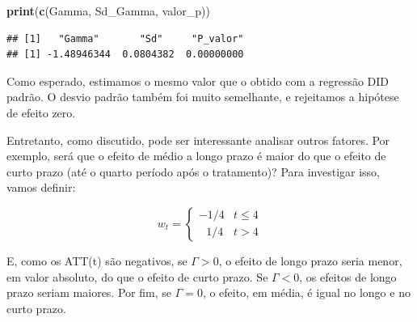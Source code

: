 \documentclass[portugues]{article}
\newenvironment{Shaded}{\begin{snugshade}}{\end{snugshade}}
\newcommand{\AttributeTok}[1]{\textcolor[rgb]{0.13,0.29,0.53}{#1}}
\newcommand{\CommentTok}[1]{\textcolor[rgb]{0.56,0.35,0.01}{\textit{#1}}}
\newcommand{\ConstantTok}[1]{\textcolor[rgb]{0.56,0.35,0.01}{#1}}
\newcommand{\DecValTok}[1]{\textcolor[rgb]{0.00,0.00,0.81}{#1}}
\newcommand{\FunctionTok}[1]{\textcolor[rgb]{0.13,0.29,0.53}{\textbf{#1}}}
\newcommand{\NormalTok}[1]{#1}
\newcommand{\OtherTok}[1]{\textcolor[rgb]{0.56,0.35,0.01}{#1}}
\newcommand{\SpecialCharTok}[1]{\textcolor[rgb]{0.81,0.36,0.00}{\textbf{#1}}}
\begin{document}
\begin{boxA}
\begin{Shaded}
\end{Shaded}

\begin{Shaded}
\begin{Highlighting}[]
\FunctionTok{print}\NormalTok{(}\FunctionTok{c}\NormalTok{(Gamma, Sd\_Gamma, valor\_p))}
\end{Highlighting}
\end{Shaded}

\begin{verbatim}
## [1]   "Gamma"       "Sd"     "P_valor"
## [1] -1.48946344  0.0804382  0.00000000
\end{verbatim}

Como esperado, estimamos o mesmo valor que o obtido com a regressão DID padrão. O desvio padrão também foi muito semelhante, e rejeitamos a hipótese de efeito zero.

Entretanto, como discutido, pode ser interessante analisar outros fatores. Por exemplo, será que o efeito de médio a longo prazo é maior do que o efeito de curto prazo (até o quarto período após o tratamento)? Para investigar isso, vamos definir:

$$ w_t = \begin{cases} -1/4 & t \leq 4 \\ \text{  } 1/4 & t > 4 \end{cases} $$

E, como os ATT(t) são negativos, se $\Gamma > 0$, o efeito de longo prazo seria menor, em valor absoluto, do que o efeito de curto prazo. Se $\Gamma < 0$, os efeitos de longo prazo seriam maiores. Por fim, se $\Gamma = 0$, o efeito, em média, é igual no longo e no curto prazo.



\end{boxA}
\end{document}
